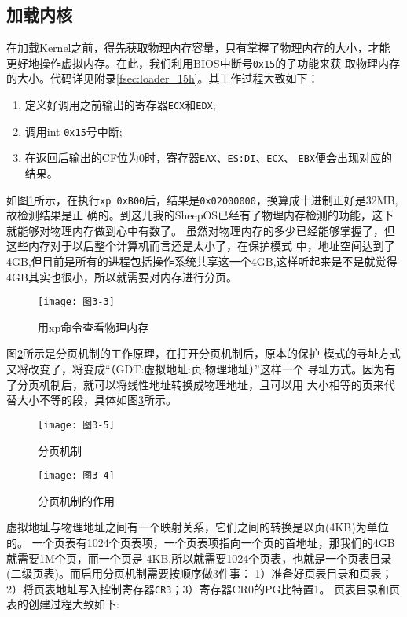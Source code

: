 \subsection{加载内核}
\label{subsec:kernel}

在加载Kernel之前，得先获取物理内存容量，只有掌握了物理内存的大小，才能
更好地操作虚拟内存。在此，我们利用BIOS中断号\texttt{0x15}的子功能来获
取物理内存的大小。代码详见附录\ref{fsec:loader_15h}。其工作过程大致如下：
\begin{enumerate}
\item 定义好调用之前输出的寄存器\texttt{ECX}和\texttt{EDX};
\item 调用int \texttt{0x15}号中断;
\item 在返回后输出的CF位为0时，寄存器\texttt{EAX}、\texttt{ES:DI}、\texttt{ECX}、
  \texttt{EBX}便会出现对应的结果。
\end{enumerate}

如图\ref{fig:xp}所示，在执行\texttt{xp 0xB00}后，结果是\texttt{0x02000000}，换算成十进制正好是32MB,故检测结果是正
确的。到这儿我的SheepOS已经有了物理内存检测的功能，这下就能够对物理内存做到心中有数了。
虽然对物理内存的多少已经能够掌握了，但这些内存对于以后整个计算机而言还是太小了，在保护模式
中，地址空间达到了4GB,但目前是所有的进程包括操作系统共享这一个4GB,这样听起来是不是就觉得
4GB其实也很小，所以就需要对内存进行分页。

\begin{figure}
  \centering
  \texttt{[image: 图3-3]}
  \caption{用xp命令查看物理内存}
  \label{fig:xp}
\end{figure}

图\ref{fig:fenye}所示是分页机制的工作原理，在打开分页机制后，原本的保护
模式的寻址方式又将改变了，将变成“（GDT:虚拟地址:页:物理地址）”这样一个
寻址方式。因为有了分页机制后，就可以将线性地址转换成物理地址，且可以用
大小相等的页来代替大小不等的段，具体如图\ref{fig:fenyezy}所示。

\begin{figure}
  \centering
  \texttt{[image: 图3-5]}
  \caption{分页机制}
  \label{fig:fenye}
\end{figure}

\begin{figure}[H]
  \centering
  \texttt{[image: 图3-4]}
  \caption{分页机制的作用}
  \label{fig:fenyezy}
\end{figure}

虚拟地址与物理地址之间有一个映射关系，它们之间的转换是以页(4KB)为单位的。
一个页表有1024个页表项，一个页表项指向一个页的首地址，那我们的4GB就需要1M个页，而一个页是
4KB,所以就需要1024个页表，也就是一个页表目录(二级页表)。而启用分页机制需要按顺序做3件事：
1）准备好页表目录和页表；2）将页表地址写入控制寄存器\texttt{CR3}；3）寄存器CR0的PG比特置1。
页表目录和页表的创建过程大致如下:

